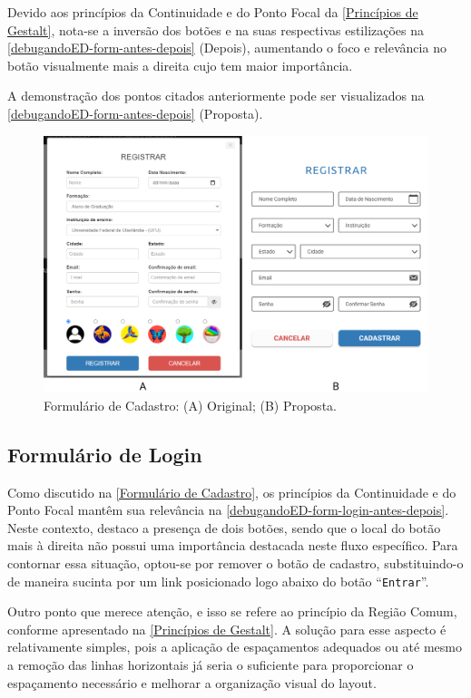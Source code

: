 Devido aos princípios da Continuidade e do Ponto Focal da \autoref{Princípios de Gestalt}, nota-se a inversão dos botões e na suas respectivas estilizações na \autoref{debugandoED-form-antes-depois} (Depois), aumentando o foco e relevância no botão visualmente mais a direita cujo tem maior importância.

A demonstração dos pontos citados anteriormente pode ser visualizados na \autoref{debugandoED-form-antes-depois} (Proposta).

\begin{figure}[htb]
    \begin{center}
	    \includegraphics[scale=0.35]{figs/debugandoED-form-antes-depois.png}
	\end{center}
    \caption{\label{debugandoED-form-antes-depois}Formulário de Cadastro: (A) Original; (B) Proposta.}
\end{figure}

\subsection{Formulário de Login}
\label{Formulário de Login}
Como discutido na \autoref{Formulário de Cadastro}, os princípios da Continuidade e do Ponto Focal mantêm sua relevância na \autoref{debugandoED-form-login-antes-depois}. Neste contexto, destaco a presença de dois botões, sendo que o local do botão mais à direita não possui uma importância destacada neste fluxo específico. Para contornar essa situação, optou-se por remover o botão de cadastro, substituindo-o de maneira sucinta por um link posicionado logo abaixo do botão “\texttt{Entrar}”.

Outro ponto que merece atenção, e isso se refere ao princípio da Região Comum, conforme apresentado na \autoref{Princípios de Gestalt}. A solução para esse aspecto é relativamente simples, pois a aplicação de espaçamentos adequados ou até mesmo a remoção das linhas horizontais já seria o suficiente para proporcionar o espaçamento necessário e melhorar a organização visual do layout.

